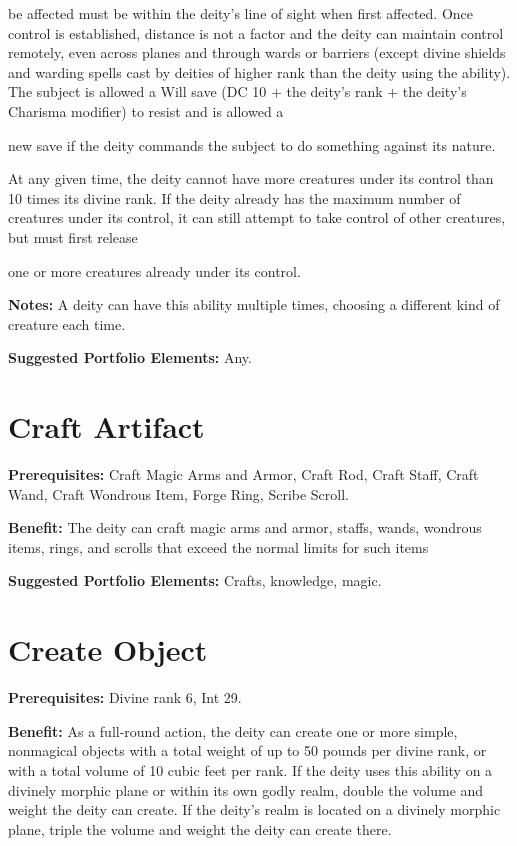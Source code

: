 \documentclass{article}
\begin{document}
be affected must be within the deity's line of sight when first affected. Once 
control is established, distance is not a factor and the deity can maintain control 
remotely, even across planes and through wards or barriers (except divine shields 
and warding spells cast by deities of higher rank than the deity using the ability). 
The subject is allowed a Will save (DC 10 + the deity's rank + the deity's Charisma 
modifier) to resist and is allowed a

new save if the deity commands the subject to do something against its nature.

At any given time, the deity cannot have more creatures under its control than 
10 times its divine rank. If the deity already has the maximum number of creatures 
under its control, it can still attempt to take control of other creatures, but 
must first release

one or more creatures already under its control. 

\textbf{Notes:} A deity can have this ability multiple times, choosing a different 
kind of creature each time.

\textbf{Suggested Portfolio Elements:} Any.

\vspace{12pt}
\section*{Craft Artifact}

\textbf{Prerequisites:} Craft Magic Arms and Armor, Craft Rod, Craft Staff, Craft 
Wand, Craft Wondrous Item, Forge Ring, Scribe Scroll.

\textbf{Benefit:} The deity can craft magic arms and armor, staffs, wands, wondrous 
items, rings, and scrolls that exceed the normal limits for such items

\textbf{Suggested Portfolio Elements:} Crafts, knowledge, magic.

\vspace{12pt}
\section*{Create Object}

\textbf{Prerequisites:} Divine rank 6, Int 29.

\textbf{Benefit:} As a full-round action, the deity can create one or more simple, 
nonmagical objects with a total weight of up to 50 pounds per divine rank, or with 
a total volume of 10 cubic feet per rank. If the deity uses this ability on a divinely 
morphic plane or within its own godly realm, double the volume and weight the deity 
can create. If the deity's realm is located on a divinely morphic plane, triple 
the volume and weight the deity can create there.
\end{document}
